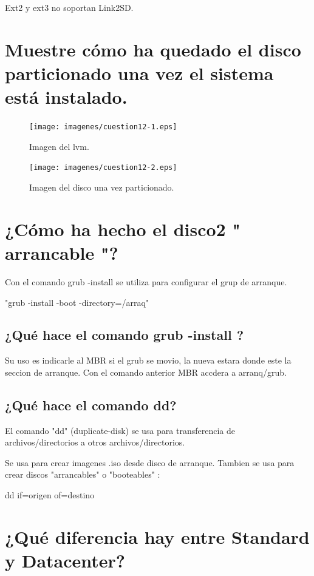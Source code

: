 Ext2 y ext3 no soportan Link2SD.
\section{Muestre cómo ha quedado el disco particionado una vez el sistema está instalado. }

\begin{figure}[H]
\begin{center}
\texttt{[image: imagenes/cuestion12-1.eps]}
\caption{Imagen del lvm.}
\end{center}
\end{figure}

\begin{figure}[H]
\begin{center}
\texttt{[image: imagenes/cuestion12-2.eps]}
\caption{ Imagen del disco una vez particionado.}
\end{center}
\end{figure}

\section{¿Cómo ha hecho el disco2 " arrancable "?}

Con el comando grub -install se utiliza para configurar el grup de arranque. 

	"grub -install -boot -directory=/arraq"
	
\subsection{¿Qué hace el comando grub -install ?}

Su uso es indicarle al MBR si el grub se movio, la nueva estara donde este la seccion de arranque. Con el comando anterior MBR accdera a arranq/grub.

\subsection{¿Qué hace el comando dd?}
El comando "dd" (duplicate-disk) se usa para transferencia de archivos/directorios a otros archivos/directorios.

Se usa para crear imagenes .iso desde disco de arranque.
Tambien se usa para crear discos "arrancables" o "booteables" :

dd if=origen of=destino

\section{¿Qué diferencia hay entre Standard y Datacenter?}

